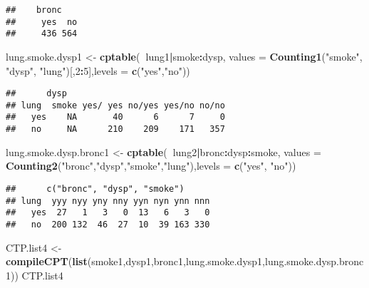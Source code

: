 \documentclass[
]{article}
\newenvironment{Shaded}{\begin{snugshade}}{\end{snugshade}}
\newcommand{\DataTypeTok}[1]{\textcolor[rgb]{0.13,0.29,0.53}{#1}}
\newcommand{\DecValTok}[1]{\textcolor[rgb]{0.00,0.00,0.81}{#1}}
\newcommand{\KeywordTok}[1]{\textcolor[rgb]{0.13,0.29,0.53}{\textbf{#1}}}
\newcommand{\NormalTok}[1]{#1}
\newcommand{\OperatorTok}[1]{\textcolor[rgb]{0.81,0.36,0.00}{\textbf{#1}}}
\newcommand{\StringTok}[1]{\textcolor[rgb]{0.31,0.60,0.02}{#1}}
\begin{document}
\begin{verbatim}
##    bronc
##     yes  no
##     436 564
\end{verbatim}

\begin{Shaded}
\begin{Highlighting}[]
\NormalTok{lung.smoke.dysp1 <-}\StringTok{ }\KeywordTok{cptable}\NormalTok{(}\OperatorTok{~}\NormalTok{lung1}\OperatorTok{|}\NormalTok{smoke}\OperatorTok{:}\NormalTok{dysp, }\DataTypeTok{values =} \KeywordTok{Counting1}\NormalTok{(}\StringTok{"smoke"}\NormalTok{, }\StringTok{"dysp"}\NormalTok{, }\StringTok{"lung"}\NormalTok{)[,}\DecValTok{2}\OperatorTok{:}\DecValTok{5}\NormalTok{],}\DataTypeTok{levels =} \KeywordTok{c}\NormalTok{(}\StringTok{"yes"}\NormalTok{,}\StringTok{"no"}\NormalTok{))}
\end{Highlighting}
\end{Shaded}

\begin{verbatim}
##      dysp
## lung  smoke yes/ yes no/yes yes/no no/no
##   yes    NA       40      6      7     0
##   no     NA      210    209    171   357
\end{verbatim}

\begin{Shaded}
\begin{Highlighting}[]
\NormalTok{lung.smoke.dysp.bronc1 <-}\StringTok{ }\KeywordTok{cptable}\NormalTok{(}\OperatorTok{~}\NormalTok{lung2}\OperatorTok{|}\NormalTok{bronc}\OperatorTok{:}\NormalTok{dysp}\OperatorTok{:}\NormalTok{smoke, }\DataTypeTok{values =} \KeywordTok{Counting2}\NormalTok{(}\StringTok{"bronc"}\NormalTok{,}\StringTok{"dysp"}\NormalTok{,}\StringTok{"smoke"}\NormalTok{,}\StringTok{"lung"}\NormalTok{),}\DataTypeTok{levels =} \KeywordTok{c}\NormalTok{(}\StringTok{"yes"}\NormalTok{, }\StringTok{"no"}\NormalTok{))}
\end{Highlighting}
\end{Shaded}

\begin{verbatim}
##      c("bronc", "dysp", "smoke")
## lung  yyy nyy yny nny yyn nyn ynn nnn
##   yes  27   1   3   0  13   6   3   0
##   no  200 132  46  27  10  39 163 330
\end{verbatim}

\begin{Shaded}
\begin{Highlighting}[]
\NormalTok{CTP.list4 <-}\StringTok{ }\KeywordTok{compileCPT}\NormalTok{(}\KeywordTok{list}\NormalTok{(smoke1,dysp1,bronc1,lung.smoke.dysp1,lung.smoke.dysp.bronc1))}
\NormalTok{CTP.list4}
\end{Highlighting}
\end{Shaded}
\end{document}
